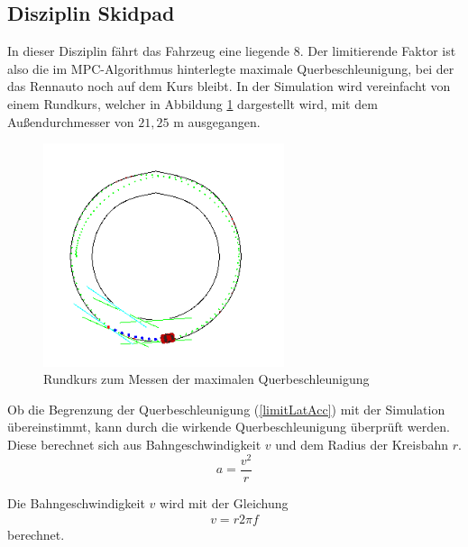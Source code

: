 \documentclass{like}
\begin{document}
\subsection{Disziplin Skidpad}
In dieser Disziplin fährt das Fahrzeug eine liegende 8. Der limitierende Faktor ist also die im \ac{MPC}-Algorithmus hinterlegte maximale Querbeschleunigung, bei der das Rennauto noch auf dem Kurs bleibt. In der Simulation wird vereinfacht von einem Rundkurs, welcher in Abbildung \ref{fig:roundCourse} dargestellt wird, mit dem Außendurchmesser von $21,25$ m ausgegangen. 
\begin{figure}
	\centering
	\includegraphics[width=200pt]{Abbildungen/roundCourse.png}
	\caption{Rundkurs zum Messen der maximalen Querbeschleunigung}
	\label{fig:roundCourse}
\end{figure}
Ob die Begrenzung der Querbeschleunigung (\ref{limitLatAcc}) mit der Simulation übereinstimmt, kann durch die wirkende Querbeschleunigung überprüft werden.
Diese berechnet sich aus Bahngeschwindigkeit $v$ und dem Radius der Kreisbahn $r$. 
\begin{equation}
	a = \frac{v^2}{r}
\end{equation}

Die Bahngeschwindigkeit $v$ wird mit der Gleichung
\begin{eqnarray}
	 v = r  2 \pi f
\end{eqnarray}
berechnet.
\end{document}
